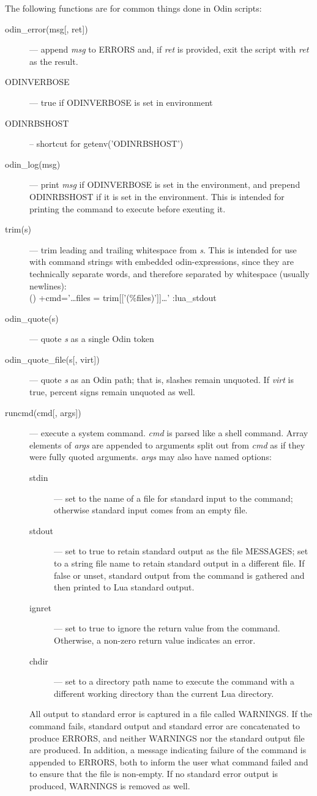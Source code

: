The following functions are for common things done in Odin scripts:

\begin{description}
\item[odin\_error(msg{[}, ret{]})] --- append \emph{msg} to {\ex ERRORS}
and, if \emph{ret} is provided, exit the script with \emph{ret} as the
result.
\item[ODINVERBOSE] --- true if ODINVERBOSE is set in environment
\item[ODINRBSHOST] -- shortcut for {\ex getenv('ODINRBSHOST')}
\item[odin\_log(msg)] --- print \emph{msg} if ODINVERBOSE is set in
the environment, and prepend ODINRBSHOST if it is set in the
environment.  This is intended for printing the command to execute
before exeuting it.
\item[trim(s)] --- trim leading and trailing whitespace from \emph{s}.
This is intended for use with command strings with embedded
odin-expressions, since they are technically separate words, and
therefore separated by whitespace (usually newlines):\\
{\ex () +cmd='{\ldots}files = trim{[}{[}'(\%files)'{]}{]}{\ldots}' :lua\_stdout}
\item[odin\_quote(s)] --- quote \emph{s} as a single Odin token
\item[odin\_quote\_file(s{[}, virt{]})] --- quote \emph{s} as an Odin
path; that is, slashes remain unquoted.  If \emph{virt} is true,
percent signs remain unquoted as well.
\item[runcmd(cmd{[}, args{]})] --- execute a system command.
\emph{cmd} is parsed like a shell command.  Array elements of
\emph{args} are appended to arguments split out from \emph{cmd} as if
they were fully quoted arguments.  \emph{args} may also have named
options:
\begin{description}
\item[stdin] --- set to the name of a file for standard input to the
command; otherwise standard input comes from an empty file.
\item[stdout] --- set to true to retain standard output as the file
{\ex MESSAGES}; set to a string file name to retain standard output in
a different file.  If false or unset, standard output from the command
is gathered and then printed to Lua standard output.
\item[ignret] --- set to true to ignore the return value from the
command.  Otherwise, a non-zero return value indicates an error.
\item[chdir] --- set to a directory path name to execute the command
with a different working directory than the current Lua directory.
\end{description}
All output to standard error is captured in a file called {\ex
WARNINGS}.  If the command fails, standard output and standard error
are concatenated to produce {\ex ERRORS}, and neither {\ex WARNINGS}
nor the standard output file are produced.  In addition, a message
indicating failure of the command is appended to {\ex ERRORS}, both to
inform the user what command failed and to ensure that the file is
non-empty.  If no standard error output is produced, {\ex WARNINGS} is
removed as well.
\end{description}

